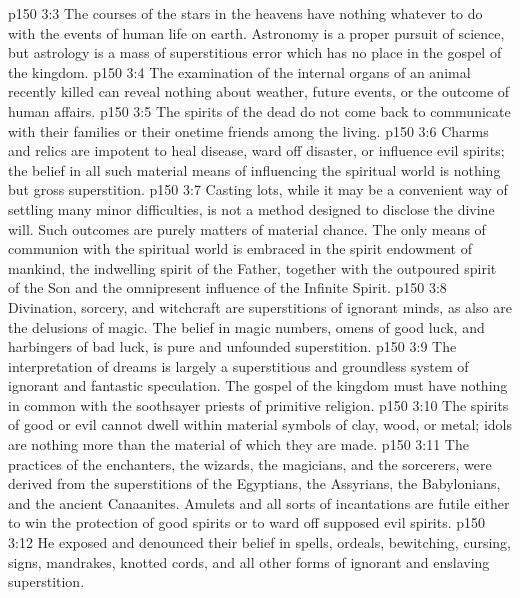 \pc \vs p150 3:3 \bibnobreakspace The courses of the stars in the heavens have nothing whatever to do with the events of human life on earth. Astronomy is a proper pursuit of science, but astrology is a mass of superstitious error which has no place in the gospel of the kingdom.
\pc \vs p150 3:4 \bibnobreakspace The examination of the internal organs of an animal recently killed can reveal nothing about weather, future events, or the outcome of human affairs.
\pc \vs p150 3:5 \bibnobreakspace The spirits of the dead do not come back to communicate with their families or their onetime friends among the living.
\pc \vs p150 3:6 \bibnobreakspace Charms and relics are impotent to heal disease, ward off disaster, or influence evil spirits; the belief in all such material means of influencing the spiritual world is nothing but gross superstition.
\pc \vs p150 3:7 \bibnobreakspace Casting lots, while it may be a convenient way of settling many minor difficulties, is not a method designed to disclose the divine will. Such outcomes are purely matters of material chance. The only means of communion with the spiritual world is embraced in the spirit endowment of mankind, the indwelling spirit of the Father, together with the outpoured spirit of the Son and the omnipresent influence of the Infinite Spirit.
\pc \vs p150 3:8 \bibnobreakspace Divination, sorcery, and witchcraft are superstitions of ignorant minds, as also are the delusions of magic. The belief in magic numbers, omens of good luck, and harbingers of bad luck, is pure and unfounded superstition.
\pc \vs p150 3:9 \bibnobreakspace The interpretation of dreams is largely a superstitious and groundless system of ignorant and fantastic speculation. The gospel of the kingdom must have nothing in common with the soothsayer priests of primitive religion.
\pc \vs p150 3:10 \bibnobreakspace The spirits of good or evil cannot dwell within material symbols of clay, wood, or metal; idols are nothing more than the material of which they are made.
\pc \vs p150 3:11 \bibnobreakspace The practices of the enchanters, the wizards, the magicians, and the sorcerers, were derived from the superstitions of the Egyptians, the Assyrians, the Babylonians, and the ancient Canaanites. Amulets and all sorts of incantations are futile either to win the protection of good spirits or to ward off supposed evil spirits.
\pc \vs p150 3:12 \bibnobreakspace He exposed and denounced their belief in spells, ordeals, bewitching, cursing, signs, mandrakes, knotted cords, and all other forms of ignorant and enslaving superstition.
